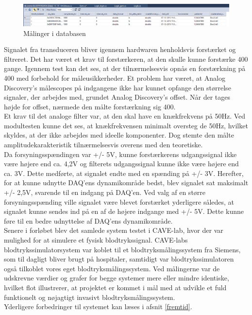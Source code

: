 \begin{figure}[H]
	\centering
	\includegraphics[width=1.1\textwidth]{Figurer/SoftwareImplementering/databasegem}
	\caption{Målinger i databasen}
	\label{databasegem}
\end{figure}

Signalet fra transduceren bliver igennem hardwaren henholdsvis forstærket og filtreret. Det har været et krav til forstærkeren, at den skulle kunne forstærke 400 gange. Igennem test kan det ses, at der tilnærmelsesvis opnås en forstærkning på 400 med forbehold for måleusikkerheder. Et problem har været, at Analog Discovery’s målescopes på indgangene ikke har kunnet opfange den størrelse signaler, der arbejdes med, grundet Analog Discovery’s offset. Når der tages højde for offset, nærmede den målte forstærkning sig 400. \\
Et krav til det analoge filter var, at den skal have en knækfrekvens på 50Hz. Ved modultesten kunne det ses, at knækfrekvensen minimalt oversteg de 50Hz, hvilket skyldes, at der ikke arbejdes med ideelle komponenter. Dog stemte den målte amplitudekarakteristik tilnærmelsesvis overens med den teoretiske. \\
Da forsyningsspændingen var +/- 5V, kunne forstærkerens udgangssignal ikke være højere end ca. 4,2V og filterets udgangssignal kunne ikke være højere end ca. 3V. Dette medførte, at signalet endte med en spænding på +/- 3V. Herefter, for at kunne udnytte DAQ’ens dynamikområde bedst, blev signalet sat maksimalt +/- 2,5V, svarende til en indgang på DAQ’en. Ved valg af en større forsyningsspænding ville signalet være blevet forstærket yderligere således, at signalet kunne sendes ind på en af de højere indgange med +/- 5V. Dette kunne føre til en bedre udnyttelse af DAQ'ens dynamikområde.\\[1ex]
Senere i forløbet blev det samlede system testet i CAVE-lab, hvor der var mulighed for at simulere et fysisk blodtrykssignal. CAVE-labs blodtrykssimulatorsystem var koblet til et blodtryksmålingssystem fra Siemens, som til dagligt bliver brugt på hospitaler, samtidigt var blodtrykssimulatoren også tilkoblet vores eget blodtryksmålingssystem. Ved målingerne var de udskrevne værdier og grafer for begge systemer mere eller mindre identiske, hvilket flot illustrerer, at projektet er kommet i mål med at udvikle et fuld funktionelt og nøjagtigt invasivt blodtryksmålingssystem. 
\\
Yderligere forbedringer til systemet kan læses i afsnit \ref{fremtid}.\\



